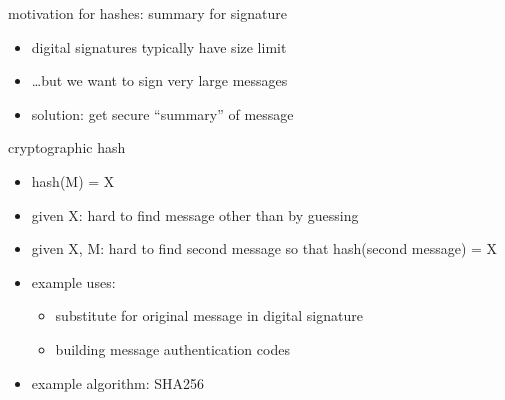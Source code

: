 \begin{frame}{motivation for hashes: summary for signature}
    \begin{itemize}
    \item digital signatures typically have size limit
    \item \ldots but we want to sign very large messages
    \vspace{.5cm}
    \item solution: get secure ``summary'' of message
    \end{itemize}
\end{frame}

\begin{frame}{cryptographic hash}
    \begin{itemize}
    \item hash(M) = X
    \vspace{.5cm}
    \item given X: hard to find message other than by guessing
    \item given X, M: hard to find second message so that hash(second message) = X
    \vspace{.5cm}
    \item example uses:
        \begin{itemize}
        \item substitute for original message in digital signature
        \item building message authentication codes
        \end{itemize}
    \item example algorithm: SHA256
    \end{itemize}
\end{frame}

